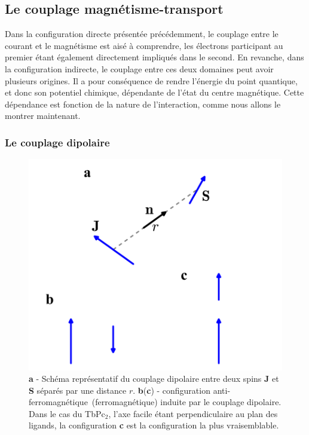 \subsection{Le couplage magnétisme-transport}
Dans la configuration directe présentée précédemment, le couplage entre le courant et le magnétisme est aisé à comprendre, les électrons participant au premier étant également directement impliqués dans le second. En revanche, dans la configuration indirecte, le couplage entre ces deux domaines peut avoir plusieurs origines. Il a pour conséquence de rendre l'énergie du point quantique, et donc son potentiel chimique, dépendante de l'état du centre magnétique. Cette dépendance est fonction de la nature de l'interaction, comme nous allons le montrer maintenant.

\subsubsection{Le couplage dipolaire}

\begin{figure}
\parbox{6.5cm}{
\includegraphics[scale=0.45]{Resultats/CDipolaire/CDipolaire.pdf} 
}
\parbox{7cm}{\caption{\textbf{a} - Schéma représentatif du couplage dipolaire entre deux spins \textbf{J} et \textbf{S} séparés par une distance $r$. \textbf{b}(\textbf{c}) - configuration anti-ferromagnétique~(ferromagnétique) induite par le couplage dipolaire. Dans le cas du TbPc$_2$, l'axe facile étant perpendiculaire au plan des ligands, la configuration \textbf{c} est la configuration la plus vraisemblable.}
\label{dipolaire}
}
\end{figure}


